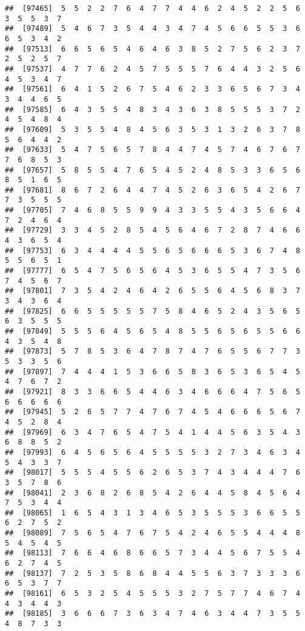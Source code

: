 \documentclass[
]{book}
\begin{document}
\begin{verbatim}
##  [97465]  5  5  2  2  7  6  4  7  7  4  4  6  2  4  5  2  2  5  6  3  5  5  3  7
##  [97489]  5  4  6  7  3  5  4  4  3  4  7  4  5  6  6  5  5  3  6  6  5  3  4  2
##  [97513]  6  6  5  6  5  4  6  4  6  3  8  5  2  7  5  6  2  3  7  2  5  2  5  7
##  [97537]  4  7  7  6  2  4  5  7  5  5  5  7  6  4  4  3  2  5  6  4  5  3  4  7
##  [97561]  6  4  1  5  2  6  7  5  4  6  2  3  3  6  5  6  7  3  4  3  4  4  6  5
##  [97585]  6  4  3  5  5  4  8  3  4  3  6  3  8  5  5  5  3  7  2  4  5  4  8  4
##  [97609]  5  3  5  5  4  8  4  5  6  3  5  3  1  3  2  6  3  7  8  5  6  4  4  2
##  [97633]  5  4  7  5  6  5  7  8  4  4  7  4  5  7  4  6  7  6  7  7  6  8  5  3
##  [97657]  5  8  5  5  4  7  6  5  4  5  2  4  8  5  3  3  6  5  6  8  5  1  6  5
##  [97681]  8  6  7  2  6  4  4  7  4  5  2  6  3  6  5  4  2  6  7  7  3  5  5  5
##  [97705]  7  4  6  8  5  5  9  9  4  3  3  5  5  4  3  5  6  6  4  7  2  4  6  4
##  [97729]  3  3  4  5  2  8  5  4  5  6  4  6  7  2  8  7  4  6  6  4  3  6  5  4
##  [97753]  6  3  4  4  4  4  5  5  6  5  6  6  6  5  3  6  7  4  8  5  5  6  5  1
##  [97777]  6  5  4  7  5  6  5  6  4  5  3  6  5  5  4  7  3  5  6  7  4  5  6  7
##  [97801]  7  3  5  4  2  4  6  4  2  6  5  5  6  4  5  6  8  3  7  3  4  3  6  4
##  [97825]  6  6  5  5  5  5  5  7  5  8  4  6  5  2  4  3  5  6  5  6  3  5  5  5
##  [97849]  5  5  5  6  4  5  6  5  4  8  5  5  6  5  6  5  5  6  6  4  3  5  4  8
##  [97873]  5  7  8  5  3  6  4  7  8  7  4  7  6  5  5  6  7  7  3  5  3  3  5  6
##  [97897]  7  4  4  4  1  5  3  6  6  5  8  3  6  5  3  6  5  4  5  4  7  6  7  2
##  [97921]  8  3  3  6  6  5  4  4  6  3  4  6  6  6  4  7  5  6  5  6  6  6  6  6
##  [97945]  5  2  6  5  7  7  4  7  6  7  4  5  4  6  6  6  5  6  7  4  5  2  8  4
##  [97969]  6  3  4  7  6  5  4  7  5  4  1  4  4  5  6  3  5  4  3  6  8  8  5  2
##  [97993]  6  4  5  6  5  6  4  5  5  5  5  3  2  7  3  4  6  3  4  5  4  3  3  7
##  [98017]  5  5  5  4  5  5  6  2  6  5  3  7  4  3  4  4  4  7  6  3  5  7  8  6
##  [98041]  2  3  6  8  2  6  8  5  4  2  6  4  4  5  8  4  5  6  4  7  5  3  4  4
##  [98065]  1  6  5  4  3  1  3  4  6  5  3  5  5  5  3  6  6  5  5  6  2  7  5  2
##  [98089]  7  5  6  5  4  7  6  7  5  4  2  4  6  5  5  4  4  4  8  5  4  5  4  5
##  [98113]  7  6  6  4  6  8  6  6  5  7  3  4  4  5  6  7  5  5  4  6  2  7  4  5
##  [98137]  7  2  5  3  5  8  6  8  4  4  5  5  6  3  7  3  3  3  6  6  5  3  7  7
##  [98161]  6  5  3  2  5  4  5  5  5  3  2  7  5  7  7  4  6  7  4  4  3  4  4  3
##  [98185]  3  6  6  6  7  3  6  3  4  7  4  6  3  4  4  7  3  5  5  4  8  7  3  3

\end{verbatim}
\end{document}
